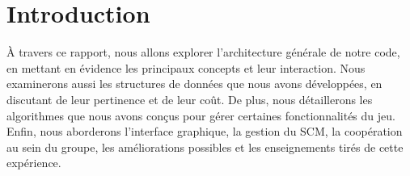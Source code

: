 \section{Introduction}

À travers ce rapport, nous allons explorer l'architecture générale de notre code, en mettant en évidence les principaux concepts et leur interaction. Nous examinerons aussi les structures de données que nous avons développées, en discutant de leur pertinence et de leur coût. De plus, nous détaillerons les algorithmes que nous avons conçus pour gérer certaines fonctionnalités du jeu. Enfin, nous aborderons l'interface graphique, la gestion du SCM, la coopération au sein du groupe, les améliorations possibles et les enseignements tirés de cette expérience.